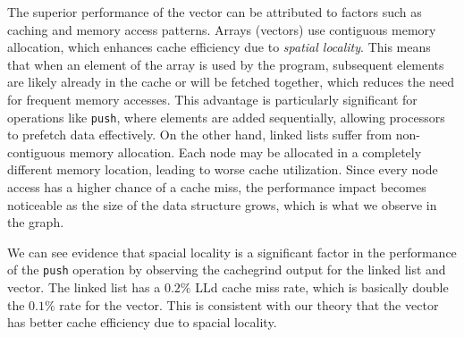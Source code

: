 \documentclass{article}
\begin{document}
The superior performance of the vector can be attributed to factors such as caching and memory access patterns. 
Arrays (vectors) use contiguous memory allocation, which enhances cache efficiency due to \textit{spatial locality}. 
This means that when an element of the array is used by the program, subsequent elements are likely already in the cache or will be fetched together, which reduces the need for frequent memory accesses. 
This advantage is particularly significant for operations like \texttt{push}, where elements are added sequentially, allowing processors to prefetch data effectively.
On the other hand, linked lists suffer from non-contiguous memory allocation. 
Each node may be allocated in a completely different memory location, leading to worse cache utilization. 
Since every node access has a higher chance of a cache miss, the performance impact becomes noticeable as the size of the data structure grows, which is what we observe in the graph.

We can see evidence that spacial locality is a significant factor in the performance of the \texttt{push} operation by observing the cachegrind output for the linked list and vector.
The linked list has a $0.2\%$ LLd cache miss rate, which is basically double the $0.1\%$ rate for the vector.
This is consistent with our theory that the vector has better cache efficiency due to spacial locality.
\end{document}
